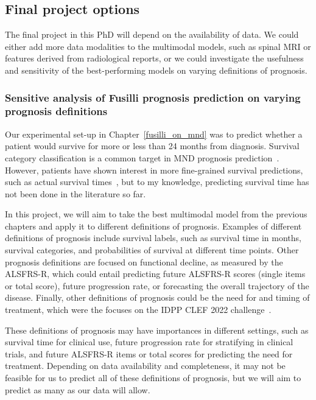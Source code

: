 \subsection{Final project options}

The final project in this PhD will depend on the availability of data.
We could either add more data modalities to the multimodal models, such as spinal MRI or features derived from radiological reports, or we could investigate the usefulness and sensitivity of the best-performing models on varying definitions of prognosis.

\subsubsection*{Sensitive analysis of Fusilli prognosis prediction on varying prognosis definitions}

Our experimental set-up in Chapter~\ref{fusilli_on_mnd} was to predict whether a patient would survive for more or less than 24 months from diagnosis.
Survival category classification is a common target in MND prognosis prediction~\cite{ongPredictingFunctionalDecline2017,grollemundDevelopmentValidation1year2020, schusterSurvivalPredictionAmyotrophic2017, vanderburghDeepLearningPredictions2017}.
However, patients have shown interest in more fine-grained survival predictions, such as actual survival times~\cite{westenengPrognosisPatientsAmyotrophic2018}, but to my knowledge, predicting survival time has not been done in the literature so far.

In this project, we will aim to take the best multimodal model from the previous chapters and apply it to different definitions of prognosis.
Examples of different definitions of prognosis include survival labels, such as survival time in months, survival categories, and probabilities of survival at different time points.
Other prognosis definitions are focused on functional decline, as measured by the ALSFRS-R, which could entail predicting future ALSFRS-R scores (single items or total score), future progression rate, or forecasting the overall trajectory of the disease.
Finally, other definitions of prognosis could be the need for and timing of treatment, which were the focuses on the IDPP CLEF 2022 challenge~\cite{guazzoOverviewIDPPCLEF2022}.

These definitions of prognosis may have importances in different settings, such as survival time for clinical use, future progression rate for stratifying in clinical trials, and future ALSFRS-R items or total scores for predicting the need for treatment.
Depending on data availability and completeness, it may not be feasible for us to predict all of these definitions of prognosis, but we will aim to predict as many as our data will allow.

